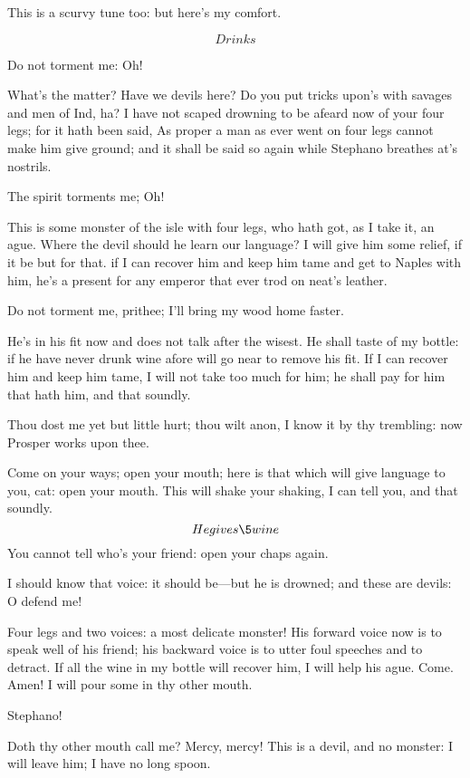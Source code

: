 \documentclass[11pt]{book}
\begin{document}
\begin{PROSE}

	This is a scurvy tune too: but here's my comfort.

	\[Drinks\]

\5	Do not torment me: Oh!

	What's the matter? Have we devils here? Do you put
	tricks upon's with savages and men of Ind, ha? I
	have not scaped drowning to be afeard now of your
	four legs; for it hath been said, As proper a man as
	ever went on four legs cannot make him give ground;
	and it shall be said so again while Stephano
	breathes at's nostrils.

\5	The spirit torments me; Oh!

	This is some monster of the isle with four legs, who
	hath got, as I take it, an ague. Where the devil
	should he learn our language? I will give him some
	relief, if it be but for that. if I can recover him
	and keep him tame and get to Naples with him, he's a
	present for any emperor that ever trod on neat's leather.

\5	Do not torment me, prithee; I'll bring my wood home faster.

	He's in his fit now and does not talk after the
	wisest. He shall taste of my bottle: if he have
	never drunk wine afore will go near to remove his
	fit. If I can recover him and keep him tame, I will
	not take too much for him; he shall pay for him that
	hath him, and that soundly.

\5	Thou dost me yet but little hurt; thou wilt anon, I
	know it by thy trembling: now Prosper works upon thee.


  Come on your ways; open your mouth; here is that
	which will give language to you, cat: open your
	mouth. This will shake your shaking, I can tell you,
	and that soundly. \[He gives \5 wine\] You cannot tell
   who's your friend: open your chaps again.

	I should know that voice: it should be---but he is
	drowned; and these are devils: O defend me!

	Four legs and two voices: a most delicate monster!
	His forward voice now is to speak well of his
	friend; his backward voice is to utter foul speeches
	and to detract. If all the wine in my bottle will
	recover him, I will help his ague. Come. Amen! I
	will pour some in thy other mouth.

	Stephano!

	Doth thy other mouth call me? Mercy, mercy! This is
	a devil, and no monster: I will leave him; I have no
	long spoon.


\end{PROSE}
\end{document}
